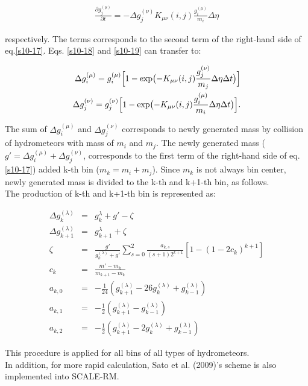 \begin{eqnarray}
\frac{\partial g_{j}^{(\mu)}}{\partial t}=-\Delta g^{(\nu)}_{j}K_{\mu\nu}(i,j)\frac{g_{i}^{(\mu)}}{m_{i}}\Delta \eta\label{s10-19}
\end{eqnarray}

respectively. The terms corresponds to the second term of the right-hand side of eq.\ref{s10-17}. Eqs. \ref{s10-18} and \ref{s10-19} can transfer to:

\begin{eqnarray}
\Delta g_{i}^{(\mu)}=g_{i}^{(\mu)}\Bigl [1-\exp\bigl(-K_{\mu\nu}(i,j)\frac{g^{(\nu)}_{j}}{m_{j}}\Delta \eta\Delta t\bigr) \Bigl]\label{s10-20}\\
\Delta g_{j}^{(\nu)}=g_{j}^{(\nu)}\Bigl [1-\exp\bigl(-K_{\mu\nu}(i,j)\frac{g^{(\mu)}_{i}}{m_{i}}\Delta \eta\Delta t\bigr) \Bigl].\label{s10-21}
\end{eqnarray}

The sum of $\Delta g_{i}^{(\mu)}$ and $\Delta g_{j}^{(\nu)}$ corresponds to newly generated mass by collision of hydrometeors with mass of $m_{i}$ and $m_{j}$. The newly generated mass ($g'=\Delta g_{i}^{(\mu)}+\Delta g_{j}^{(\nu)}$,  corresponds to the first term of the right-hand side of eq.\ref{s10-17}) added k-th bin ($m_{k}=m_{i}+m_{j}$). Since $m_{k}$ is not always bin center, newly generated mass is divided to the k-th and k+1-th bin, as follows.\\
The production of k-th and k+1-th bin is represented as:

\begin{eqnarray}
\Delta g_{k}^{(\lambda)}&=&g_{k}^{\lambda}+g'-\zeta\label{s10-22}\\
\Delta g_{k+1}^{(\lambda)}&=&g_{k+1}^{\lambda}+\zeta\label{s10-23}\\
\zeta&=&\frac{g'}{g_{k}^{(\lambda)}+g'}\sum_{s=0}^{2}\frac{a_{k,s}}{(s+1)2^{k+1}}[1-(1-2c_{k})^{k+1}]\nonumber\\
c_{k}&=&\frac{m'-m_{k}}{m_{k+1}-m_{k}}\nonumber\\
a_{k,0}&=&-\frac{1}{24}(g_{k+1}^{(\lambda)}-26g_{k}^{(\lambda)}+g_{k-1}^{(\lambda)})\nonumber\\
a_{k,1}&=&-\frac{1}{2}(g_{k+1}^{(\lambda)}-g_{k-1}^{(\lambda)})\nonumber\\
a_{k,2}&=&-\frac{1}{2}(g_{k+1}^{(\lambda)}-2g_{k}^{(\lambda)}+g_{k-1}^{(\lambda)})\nonumber
\end{eqnarray}

This procedure is applied for all bins of all types of hydrometeors.\\
In addition, for more rapid calculation, Sato et al. (2009)\cite{sato_etal_2009}’s scheme is also implemented into SCALE-RM.

